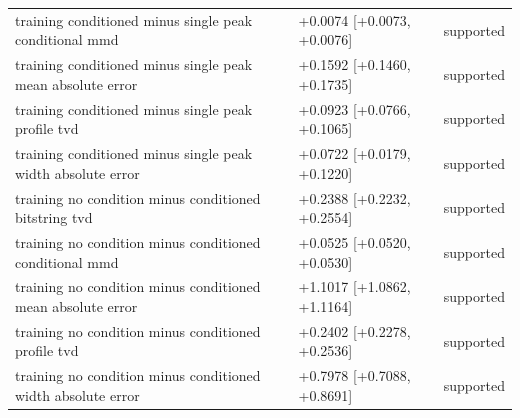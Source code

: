 \begin{table}[p]
\begin{tabular}{@{}p{}p{}p{}@{}}
training conditioned minus single peak conditional mmd & +0.0074 [+0.0073, +0.0076] & supported \\
training conditioned minus single peak mean absolute error & +0.1592 [+0.1460, +0.1735] & supported \\
training conditioned minus single peak profile tvd & +0.0923 [+0.0766, +0.1065] & supported \\
training conditioned minus single peak width absolute error & +0.0722 [+0.0179, +0.1220] & supported \\
training no condition minus conditioned bitstring tvd & +0.2388 [+0.2232, +0.2554] & supported \\
training no condition minus conditioned conditional mmd & +0.0525 [+0.0520, +0.0530] & supported \\
training no condition minus conditioned mean absolute error & +1.1017 [+1.0862, +1.1164] & supported \\
training no condition minus conditioned profile tvd & +0.2402 [+0.2278, +0.2536] & supported \\
training no condition minus conditioned width absolute error & +0.7978 [+0.7088, +0.8691] & supported \\
\bottomrule
\end{tabular}
\end{table}
\clearpage
